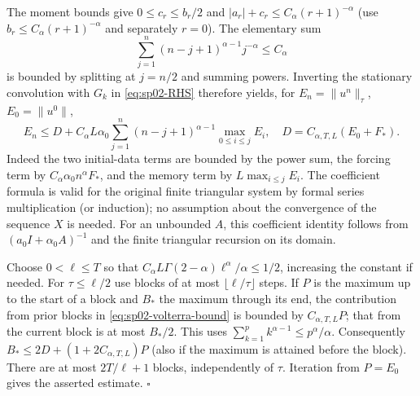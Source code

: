 \documentclass[11pt,a4paper]{amsart}
\theoremstyle{remark}
\theoremstyle{plain}
\theoremstyle{remark}
\numberwithin{equation}{section}
\begin{document}
The moment bounds give $0\le c_r\le b_r/2$ and $|a_r|+c_r\le C_\alpha(r+1)^{-\alpha}$ (use $b_r\le C_\alpha(r+1)^{-\alpha}$ and separately $r=0$). The elementary sum
\[
 \sum_{j=1}^n(n-j+1)^{\alpha-1}j^{-\alpha}\le C_\alpha
\]
is bounded by splitting at $j=n/2$ and summing powers. Inverting the stationary convolution with $G_k$ in \eqref{eq:sp02-RHS} therefore yields, for $E_n=\|u^n\|_\tau$, $E_0=\|u^0\|$,
\begin{equation}\label{eq:sp02-volterra-bound}
 E_n\le D+C_\alpha L\alpha_0\sum_{j=1}^n(n-j+1)^{\alpha-1}\max_{0\le i\le j}E_i,
 \quad D=C_{\alpha,T,L}(E_0+F_*).
\end{equation}
Indeed the two initial-data terms are bounded by the power sum, the forcing term by $C_\alpha\alpha_0 n^\alpha F_*$, and the memory term by $L\max_{i\le j}E_i$. The coefficient formula is valid for the original finite triangular system by formal series multiplication (or induction); no assumption about the convergence of the sequence $X$ is needed. For an unbounded $A$, this coefficient identity follows from $(a_0I+\alpha_0 A)^{-1}$ and the finite triangular recursion on its domain.

Choose $0<\ell\le T$ so that $C_\alpha L\Gamma(2-\alpha)\ell^\alpha/\alpha\le 1/2$, increasing the constant if needed. For $\tau\le\ell/2$ use blocks of at most $\lfloor\ell/\tau\rfloor$ steps. If $P$ is the maximum up to the start of a block and $B_*$ the maximum through its end, the contribution from prior blocks in \eqref{eq:sp02-volterra-bound} is bounded by $C_{\alpha,T,L}P$; that from the current block is at most $B_*/2$. This uses $\sum_{k=1}^p k^{\alpha-1}\le p^\alpha/\alpha$. Consequently $B_*\le 2D+(1+2C_{\alpha,T,L})P$ (also if the maximum is attained before the block). There are at most $2T/\ell+1$ blocks, independently of $\tau$. Iteration from $P=E_0$ gives the asserted estimate. \hfill$\square$
\end{document}
